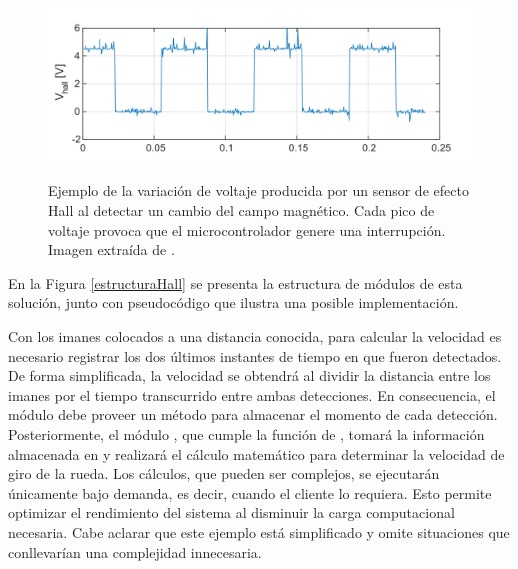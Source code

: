 \begin{figure}[H]
    
    \caption{Ejemplo de la variación de voltaje producida por un sensor de efecto Hall al detectar un cambio del campo magnético. Cada pico de voltaje provoca que el microcontrolador genere una interrupción. Imagen extraída de \cite{disenioViejo2}.}
    \centering
    \includegraphics[width=0.8\linewidth]{sensorHall.png}
    \label{hall}
\end{figure}


En la Figura \ref{estructuraHall} se presenta la estructura de módulos de esta solución, junto con pseudocódigo que ilustra una posible implementación.

Con los imanes colocados a una distancia conocida, para calcular la velocidad es necesario registrar los dos últimos instantes de tiempo en que fueron detectados. De forma simplificada, la velocidad se obtendrá al dividir la distancia entre los imanes por el tiempo transcurrido entre ambas detecciones. En consecuencia, el módulo \Colector debe proveer un método para almacenar el momento de cada detección. Posteriormente, el módulo \SensorVelocidad, que cumple la función de \Computador, tomará la información almacenada en \Colector y realizará el cálculo matemático para determinar la velocidad de giro de la rueda. Los cálculos, que pueden ser complejos, se ejecutarán únicamente bajo demanda, es decir, cuando el cliente lo requiera. Esto permite optimizar el rendimiento del sistema al disminuir la carga computacional necesaria. Cabe aclarar que este ejemplo está simplificado y omite situaciones que conllevarían una complejidad innecesaria.

